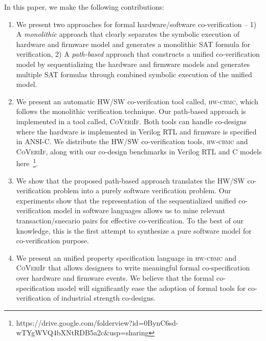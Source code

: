 \documentclass[sigconf]{acmart}
\newcommand{\tool}[1]{\textsc{#1}\xspace}
\newcommand{\hwcbmcv}{\tool{hw-cbmc}}
\newcommand{\verifox}{\tool{CoVeriIf}}
\begin{document}
In this paper, we make the following contributions:
\begin{enumerate}
  
  \item We present two approaches for formal hardware/software co-verification
    -- 1) A \emph{monolithic} approach that clearly separates the symbolic
    execution of hardware and firmware model and generates a monolithic SAT
    formula for verification, 2) A \emph{path-based} approach that constructs a
    unified co-verification model by sequentializing the hardware and firmware
    models and generates multiple SAT formulas through combined symbolic
    execution of the unified model. 
  
  \item We present an automatic HW/SW co-verifcation tool called, \hwcbmcv,
    which follows the monolithic verification technique.  Our path-based 
    approach is implemented in a tool called, \verifox. Both tools can handle
    co-designs where the hardware is implemented in Verilog RTL and firmware is  
    specified in ANSI-C.  We distribute the HW/SW co-verification tools, \hwcbmcv and 
    \verifox, along with our co-design benchmarks in Verilog RTL and C models
here~\footnote{https://drive.google.com/folderview?id=0BynC6sd-wTYgWVQ4bXNtRDB5a2c\&usp=sharing}. 

  \item We show that the proposed path-based approach translates the HW/SW co-verification problem
     into a purely software verification problem.  Our experiments show that the representation
     of the sequentialized unified co-verification model in software languages allows us to 
     mine relevant transaction/snecario pairs for effective co-verification.  To the 
     best of our knowledge, this is the first attempt to synthesize a pure
     software model for co-verification purpose.  

   \item We present an unified property specification language in \hwcbmcv and 
     \verifox that allows designers to write meaningful formal co-specification 
     over hardware and firmware events. We believe that the formal
     co-specification model will significantly ease the adoption of formal tools 
     for co-verification of industrial strength co-designs. 
    
\end{enumerate}
%
\end{document}
